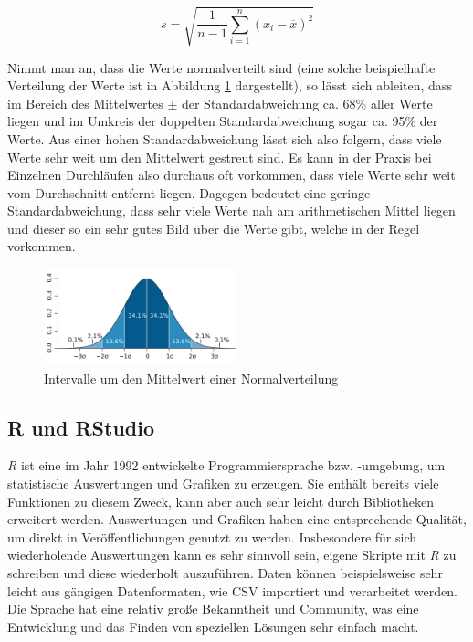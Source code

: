 \begin{equation} \label{eq:standardAbw}
    s=\sqrt{\frac{1}{n-1}\sum_{i=1}^{n}\left(x_{i}-\overline{x}\right)^{2}}
\end{equation}

Nimmt man an, dass die Werte normalverteilt sind (eine solche beispielhafte Verteilung der Werte ist in Abbildung \ref{fig:normalverteilung} dargestellt), so lässt sich ableiten, dass im Bereich des Mittelwertes $\pm$ der Standardabweichung ca. 68\% aller Werte liegen und im Umkreis der doppelten Standardabweichung sogar ca. 95\% der Werte. Aus einer hohen Standardabweichung lässt sich also folgern, dass viele Werte sehr weit um den Mittelwert gestreut sind. Es kann in der Praxis bei Einzelnen Durchläufen also durchaus oft vorkommen, dass viele Werte sehr weit vom Durchschnitt entfernt liegen. Dagegen bedeutet eine geringe Standardabweichung, dass sehr viele Werte nah am arithmetischen Mittel liegen und dieser so ein sehr gutes Bild über die Werte gibt, welche in der Regel vorkommen. \cite{papula}

\begin{figure}[H]
    \centering
    \includegraphics[width=0.5\textwidth]{images/Normalverteilung.png}
    \caption{Intervalle um den Mittelwert einer Normalverteilung \cite{normalverteilung}}
    \label{fig:normalverteilung}
\end{figure}


\subsection{R und RStudio}

\textit{R} ist eine im Jahr 1992 entwickelte Programmiersprache bzw. -umgebung, um statistische Auswertungen und Grafiken zu erzeugen. Sie enthält bereits viele Funktionen zu diesem Zweck, kann aber auch sehr leicht durch Bibliotheken erweitert werden. Auswertungen und Grafiken haben eine entsprechende Qualität, um direkt in Veröffentlichungen genutzt zu werden. Insbesondere für sich wiederholende Auswertungen kann es sehr sinnvoll sein, eigene Skripte mit \textit{R} zu schreiben und diese wiederholt auszuführen. Daten können beispielsweise sehr leicht aus gängigen Datenformaten, wie CSV importiert und verarbeitet werden. Die Sprache hat eine relativ große Bekanntheit und Community, was eine Entwicklung und das Finden von speziellen Lösungen sehr einfach macht. \cite{r}

